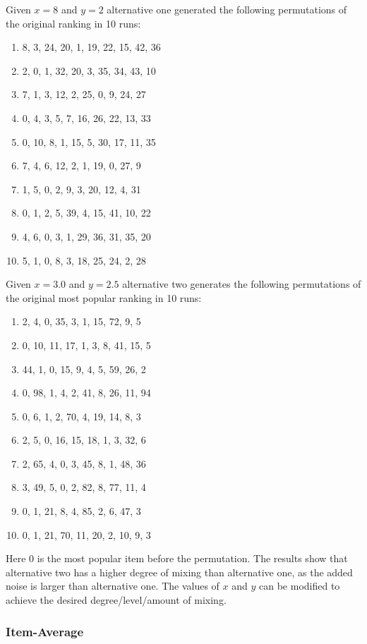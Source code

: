 Given $x=8$ and $y=2$ alternative one generated the following permutations of the original ranking in 10 runs:

\begin{enumerate}
	\item 8, 3, 24, 20, 1, 19, 22, 15, 42, 36
	\item 2, 0, 1, 32, 20, 3, 35, 34, 43, 10
	\item 7, 1, 3, 12, 2, 25, 0, 9, 24, 27
	\item 0, 4, 3, 5, 7, 16, 26, 22, 13, 33
	\item 0, 10, 8, 1, 15, 5, 30, 17, 11, 35
	\item 7, 4, 6, 12, 2, 1, 19, 0, 27, 9
	\item 1, 5, 0, 2, 9, 3, 20, 12, 4, 31
	\item 0, 1, 2, 5, 39, 4, 15, 41, 10, 22
	\item 4, 6, 0, 3, 1, 29, 36, 31, 35, 20
	\item 5, 1, 0, 8, 3, 18, 25, 24, 2, 28
\end{enumerate}

Given $x=3.0$ and $y=2.5$ alternative two generates the following permutations of the original most popular ranking in 10 runs:

\begin{enumerate}
	\item 2, 4, 0, 35, 3, 1, 15, 72, 9, 5
	\item 0, 10, 11, 17, 1, 3, 8, 41, 15, 5
	\item 44, 1, 0, 15, 9, 4, 5, 59, 26, 2
	\item 0, 98, 1, 4, 2, 41, 8, 26, 11, 94
	\item 0, 6, 1, 2, 70, 4, 19, 14, 8, 3
	\item 2, 5, 0, 16, 15, 18, 1, 3, 32, 6
	\item 2, 65, 4, 0, 3, 45, 8, 1, 48, 36
	\item 3, 49, 5, 0, 2, 82, 8, 77, 11, 4
	\item 0, 1, 21, 8, 4, 85, 2, 6, 47, 3
	\item 0, 1, 21, 70, 11, 20, 2, 10, 9, 3
\end{enumerate}

Here 0 is the most popular item before the permutation. The results show that alternative two has a higher degree of mixing than alternative one, as the added noise is larger than alternative one. The values of $x$ and $y$ can be modified to achieve the desired degree/level/amount of mixing.

\subsubsection{Item-Average}

